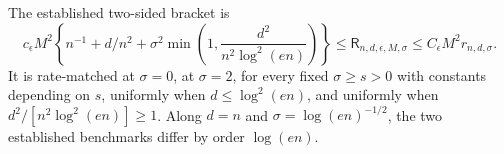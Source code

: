 The established two-sided bracket is
\[
 c_{\epsilon}M^2\left\{n^{-1}+d/n^2+\sigma^2\min\left(1,\frac{d^2}{n^2\log^2(en)}\right)\right\}
 \le \mathsf R_{n,d,\epsilon,M,\sigma}
 \le C_{\epsilon}M^2r_{n,d,\sigma}.
\]
It is rate-matched at \(\sigma=0\), at \(\sigma=2\), for every fixed \(\sigma\ge s>0\) with constants depending on \(s\), uniformly when \(d\le\log^2(en)\), and uniformly when \(d^2/[n^2\log^2(en)]\ge1\).  Along \(d=n\) and \(\sigma=\log(en)^{-1/2}\), the two established benchmarks differ by order \(\log(en)\).